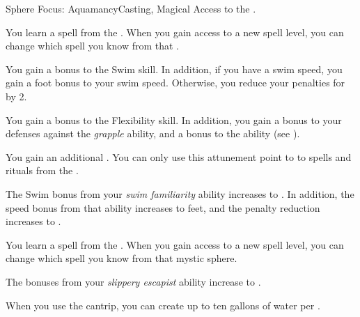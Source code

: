     \begin{feat}{Sphere Focus: Aquamancy}{Casting, Magical}
        \featpre Access to the  .

         You learn a spell from the  .
        When you gain access to a new spell level, you can change which spell you know from that .

         You gain a  bonus to the Swim skill.
        In addition, if you have a swim speed, you gain a  foot bonus to your swim speed.
        Otherwise, you reduce your penalties for \swimming by 2.

         You gain a  bonus to the Flexibility skill.
        In addition, you gain a  bonus to your defenses against the \textit{grapple} ability, and a  bonus to the  ability (see ).

         You gain an additional .
        You can only use this attunement point to  to spells and rituals from the  .

         The Swim bonus from your \textit{swim familiarity} ability increases to .
        In addition, the speed bonus from that ability increases to  feet, and the penalty reduction increases to .

         You learn a spell from the  .
        When you gain access to a new spell level, you can change which spell you know from that mystic sphere.

         The bonuses from your \textit{slippery escapist} ability increase to .

         When you use the  cantrip, you can create up to ten gallons of water per .
    \end{feat}

